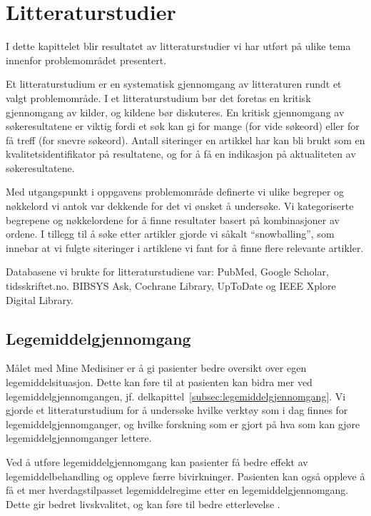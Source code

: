 \chapter{Litteraturstudier}\label{chap:lit}

I dette kapittelet blir resultatet av litteraturstudier vi har utført på ulike tema innenfor problemområdet presentert.

Et litteraturstudium er en systematisk gjennomgang av litteraturen rundt et valgt problemområde. I et litteraturstudium bør det foretas en kritisk gjennomgang av kilder, og kildene bør diskuteres. En kritisk gjennomgang av søkeresultatene er viktig fordi et søk kan gi for mange (for vide søkeord) eller for få treff (for snevre søkeord). Antall siteringer en artikkel har kan bli brukt som en kvalitetsidentifikator på resultatene, og for å få en indikasjon på aktualiteten av søkeresultatene.  

Med utgangspunkt i oppgavens problemområde definerte vi ulike begreper og nøkkelord vi antok var dekkende for det vi ønsket å undersøke. Vi kategoriserte begrepene og nøkkelordene for å finne resultater basert på kombinasjoner av ordene. I tillegg til å søke etter artikler gjorde vi såkalt “snowballing”, som innebar at vi fulgte siteringer i artiklene vi fant for å finne flere relevante artikler.

Databasene vi brukte for litteraturstudiene var: PubMed, Google Scholar, tidsskriftet.no. BIBSYS Ask, Cochrane Library, UpToDate og IEEE Xplore Digital Library.


\section{Legemiddelgjennomgang} \label{sec:littLegemiddelgjennomgang}
Målet med Mine Medisiner er å gi pasienter bedre oversikt over egen legemiddelsituasjon. Dette kan føre til at pasienten kan bidra mer ved legemiddelgjennomgangen, jf. delkapittel~\ref{subsec:legemiddelgjennomgang}. Vi gjorde et litteraturstudium for å undersøke hvilke verktøy som i dag finnes for legemiddelgjennomganger, og hvilke forskning som er gjort på hva som kan gjøre legemiddelgjennomganger lettere.  

Ved å utføre legemiddelgjennomgang kan pasienter få bedre effekt av legemiddelbehandling og oppleve færre bivirkninger. Pasienten kan også oppleve å få et mer hverdagstilpasset legemiddelregime etter en legemiddelgjennomgang. Dette gir bedret livskvalitet, og kan føre til bedre etterlevelse \citep{stmeld1820042005, legemiddelgjennomgangVeileder, MedicationReview}.

